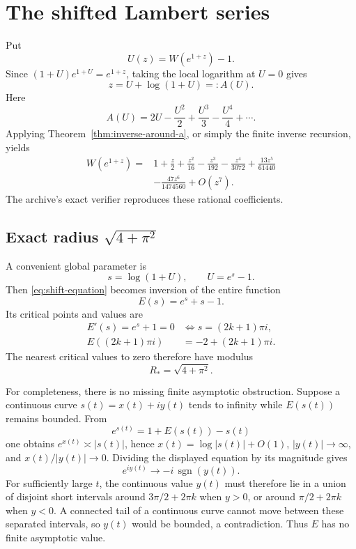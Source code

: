 \documentclass[11pt]{article}
\theoremstyle{definition}
\begin{document}
\section{The shifted Lambert series}\label{sec:shifted-lambert}

Put
\[
 U(z)=W(e^{1+z})-1.
\]
Since \((1+U)e^{1+U}=e^{1+z}\), taking the local logarithm at \(U=0\) gives
\begin{equation}\label{eq:shift-equation}
 z=U+\log(1+U)=:A(U).
\end{equation}
Here
\[
 A(U)=2U-\frac{U^2}{2}+\frac{U^3}{3}-\frac{U^4}{4}+\cdots.
\]
Applying Theorem~\ref{thm:inverse-around-a}, or simply the finite inverse
recursion, yields
\begin{equation}\label{eq:shift-series}
 \begin{split}
 W(e^{1+z})={}&1+\frac z2+\frac{z^2}{16}-\frac{z^3}{192}
 -\frac{z^4}{3072}+\frac{13z^5}{61440}\\
 &-\frac{47z^6}{1474560}+O(z^7).
 \end{split}
\end{equation}
The archive's exact verifier reproduces these rational coefficients.

\subsection{Exact radius \(\sqrt{4+\pi^2}\)}

A convenient global parameter is
\[
 s=\log(1+U),\qquad U=e^s-1.
\]
Then \eqref{eq:shift-equation} becomes inversion of the entire function
\begin{equation}\label{eq:E}
 E(s)=e^s+s-1.
\end{equation}
Its critical points and values are
\begin{align*}
 E'(s)=e^s+1=0
 &\iff s=(2k+1)\pi i,\\
 E((2k+1)\pi i)
 &=-2+(2k+1)\pi i.
\end{align*}
The nearest critical values to zero therefore have modulus
\begin{equation}\label{eq:rshift}
 R_*=\sqrt{4+\pi^2}.
\end{equation}

For completeness, there is no missing finite asymptotic obstruction.  Suppose
a continuous curve \(s(t)=x(t)+iy(t)\) tends to infinity while \(E(s(t))\)
remains bounded.  From
\[
 e^{s(t)}=1+E(s(t))-s(t)
\]
one obtains \(e^{x(t)}\asymp |s(t)|\), hence
\(x(t)=\log|s(t)|+O(1)\), \(|y(t)|\to\infty\), and
\(x(t)/|y(t)|\to0\).  Dividing the displayed equation by its magnitude gives
\[
 e^{iy(t)}\longrightarrow -i\,\operatorname{sgn}(y(t)).
\]
For sufficiently large \(t\), the continuous value \(y(t)\) must therefore lie
in a union of disjoint short intervals around
\(3\pi/2+2\pi k\) when \(y>0\), or around \(\pi/2+2\pi k\) when \(y<0\).
A connected tail of a continuous curve cannot move between these separated
intervals, so \(y(t)\) would be bounded, a contradiction.  Thus \(E\) has no
finite asymptotic value.
\end{document}
